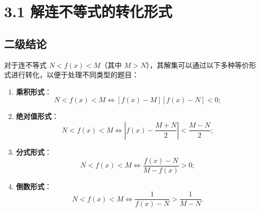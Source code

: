 \documentclass{article}
\begin{document}
\section*{3.1 解连不等式的转化形式}

\subsection*{二级结论}

对于连不等式 \( N < f(x) < M \)（其中 \( M > N \)），其解集可以通过以下多种等价形式进行转化，以便于处理不同类型的题目：

\begin{enumerate}
\item \textbf{乘积形式}：
\[
N < f(x) < M \iff [f(x) - M][f(x) - N] < 0;
\]

\item \textbf{绝对值形式}：
\[
N < f(x) < M \iff \left| f(x) - \frac{M+N}{2} \right| < \frac{M-N}{2};
\]

\item \textbf{分式形式}：
\[
N < f(x) < M \iff \frac{f(x)-N}{M-f(x)} > 0;
\]

\item \textbf{倒数形式}：
\[
N < f(x) < M \iff \frac{1}{f(x)-N} > \frac{1}{M-N}.
\]
\end{enumerate}
\end{document}

